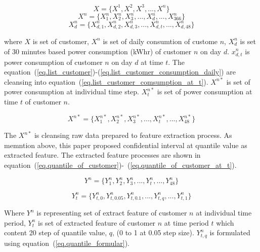 \documentclass[conference]{IEEEtran}
\begin{document}
\begin{equation}
X=\big\{ X^{1}, X^{2}, X^{3}, ..., X^{n} \big\}
\label{eq.list_customer}
\end{equation}
\begin{equation}
X^{n}=\big\{ X_{1}^{n}, X_{2}^{n}, X_{3}^{n}, ...,X_{d}^{n},..., X_{366}^{n}\big\}
\label{eq.list_customer_consumption}
\end{equation}
\begin{equation}
X_{d}^{n}=\big\{ X_{d,1}^{n}, X_{d,2}^{n}, X_{d,3}^{n}, ...,X_{d,t}^{n},..., X_{d,48}^{n}\big\}
\label{eq.list_customer_consumption_daily}
\end{equation}

where $X$ is set of customer, $X^{n}$ is set of daily consumtion of custome $n$, $X_{d}^n$ is set of 30 minutes based power consumption (kWhr) of customer $n$ on day $d$. $x_{d,t}^{n}$ is power consumption of customer $n$ on day $d$ at time $t$.
The equation~(\ref{eq.list_customer})-(\ref{eq.list_customer_consumption_daily}) are cleansing into equation~(\ref{eq.list_customer_comsumption_at_t}).
$X^{n*}$ is set of power consumption at individual time step. $X_{t}^{n*}$ is set of power consumption at time $t$ of customer $n$.

\begin{equation}
X^{n*}=\big\{ X_{1}^{n*}, X_{2}^{n*}, X_{3}^{n*}, ..., X_{t}^{n*}, ..., X_{48}^{n*} \big\}
\label{eq.list_customer_comsumption_at_t}
\end{equation}

The $X^{n*}$ is cleansing raw data prepared to feature extraction process. As memntion above, this paper proposed confidential interval at quantile value as extracted feature. The extracted feature processes are shown in equation~(\ref{eq.quantile_of_customer})-~(\ref{eq.quantile_of_customer_at_t}).

\begin{equation}
  Y^{n}=\big\{ Y_{1}^{n}, Y_{2}^{n}, Y_{3}^{n}, ..., Y_{t}^{n}, ..., Y_{48}^{n} \big\}
  \label{eq.quantile_of_customer}
\end{equation}

\begin{equation}
  Y_{t}^{n}=\big\{ Y_{t,0}^{n}, Y_{t,0.05}^{n}, Y_{t,0.1}^{n}, ..., Y_{t,q}^{n}, ..., Y_{t,1}^{n} \big\}
  \label{eq.quantile_of_customer_at_t}
\end{equation}

Where $Y^{n}$ is representing set of extract feature of customer $n$ at individual time period, $Y_{t}^{n}$ is set of extracted feature of customer $n$ at time period $t$ which content 20 step of quantile value, $q$, (0 to 1 at 0.05 step size).
$Y_{t,q}^{n}$ is formulated using equation~(\ref{eq.quantile_formular}).
\end{document}
